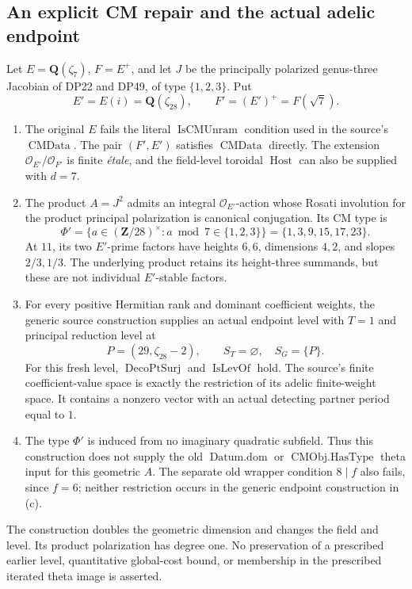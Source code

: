 \subsection{An explicit CM repair and the actual adelic endpoint}

\begin{proposition}\label{DP57}
Let $E=\mathbf Q(\zeta _7)$, $F=E^+$, and let $J$ be the principally
polarized genus-three Jacobian of DP22 and DP49, of type $\{1,2,3\}$.
Put
\[
 E'=E(i)=\mathbf Q(\zeta _{28}),\qquad F'=(E')^+=F(\sqrt7).
\]
\begin{enumerate}[label=(\alph*),leftmargin=*]
\item The original $E$ fails the literal $\operatorname{IsCMUnram}$
condition used in the source's $\operatorname{CMData}$.
The pair $(F',E')$ satisfies $\operatorname{CMData}$ directly.
The extension $\mathcal O_{E'}/\mathcal O_{F'}$ is finite
\emph{étale}, and the field-level toroidal $\operatorname{Host}$
can also be supplied with $d=7$.
\item The product $A=J^2$ admits an integral $\mathcal O_{E'}$-action
whose Rosati involution for the product principal polarization is
canonical conjugation. Its CM type is
\[
 \Phi'=\{a\in(\mathbf Z/28)^\times:a\bmod7\in\{1,2,3\}\}
      =\{1,3,9,15,17,23\}.
\]
At $11$, its two $E'$-prime factors have heights $6,6$,
dimensions $4,2$, and slopes $2/3,1/3$.
The underlying product retains its height-three summands, but these
are not individual $E'$-stable factors.
\item For every positive Hermitian rank and dominant coefficient
weights, the generic source construction supplies an actual endpoint
level with $T=1$ and principal reduction level at
\[
 P=(29,\zeta _{28}-2),\qquad
 S_T=\varnothing,\quad S_G=\{P\}.
\]
For this fresh level, $\operatorname{DecoPtSurj}$ and
$\operatorname{IsLevOf}$ hold.
The source's finite coefficient-value space is exactly the restriction
of its adelic finite-weight space. It contains a nonzero vector with
an actual detecting partner period equal to $1$.
\item The type $\Phi'$ is induced from no imaginary quadratic
subfield. Thus this construction does not supply the old
$\operatorname{Datum.dom}$ or $\operatorname{CMObj.HasType}$
theta input for this geometric $A$.
The separate old wrapper condition $8\mid f$ also fails, since $f=6$;
neither restriction occurs in the generic endpoint construction in (c).
\end{enumerate}
The construction doubles the geometric dimension and changes the field
and level. Its product polarization has degree one.
No preservation of a prescribed earlier level, quantitative global-cost
bound, or membership in the prescribed iterated theta image is asserted.
\end{proposition}

